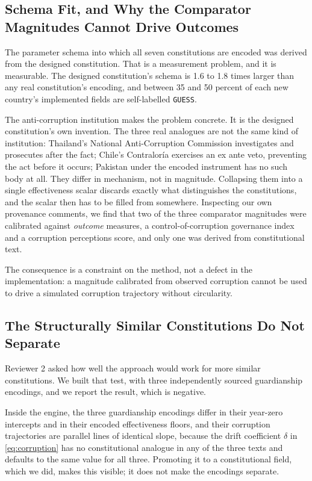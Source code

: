 \documentclass{ieeeaccess}
\begin{document}
\subsection{Schema Fit, and Why the Comparator Magnitudes Cannot Drive Outcomes}
\label{sec:schemafit}
The parameter schema into which all seven constitutions are encoded was
derived from the designed constitution. That is a measurement problem,
and it is measurable. The designed constitution's schema is 1.6 to 1.8
times larger than any real constitution's encoding, and between 35 and
50 percent of each new country's implemented fields are self-labelled
\texttt{GUESS}.

The anti-corruption institution makes the problem concrete. It is the
designed constitution's own invention. The three real analogues are not
the same kind of institution: Thailand's National Anti-Corruption
Commission investigates and prosecutes after the fact; Chile's
Contraloría exercises an ex ante veto, preventing the act before it
occurs; Pakistan under the encoded instrument has no such body at all.
They differ in mechanism, not in magnitude. Collapsing them into a
single effectiveness scalar discards exactly what distinguishes the
constitutions, and the scalar then has to be filled from somewhere.
Inspecting our own provenance comments, we find that two of the three
comparator magnitudes were calibrated against \emph{outcome} measures,
a control-of-corruption governance index and a corruption perceptions
score, and only one was derived from constitutional text.

The consequence is a constraint on the method, not a defect in the
implementation: a magnitude calibrated from observed corruption cannot
be used to drive a simulated corruption trajectory without circularity.

\subsection{The Structurally Similar Constitutions Do Not Separate}
\label{sec:nearwins}
Reviewer 2 asked how well the approach would work for more similar
constitutions. We built that test, with three independently sourced
guardianship encodings, and we report the result, which is negative.

Inside the engine, the three guardianship encodings differ in their
year-zero intercepts and in their encoded effectiveness floors, and
their corruption trajectories are parallel lines of identical slope,
because the drift coefficient $\delta$ in \eqref{eq:corruption} has no
constitutional analogue in any of the three texts and defaults to the
same value for all three. Promoting it to a constitutional field, which
we did, makes this visible; it does not make the encodings separate.
\end{document}
